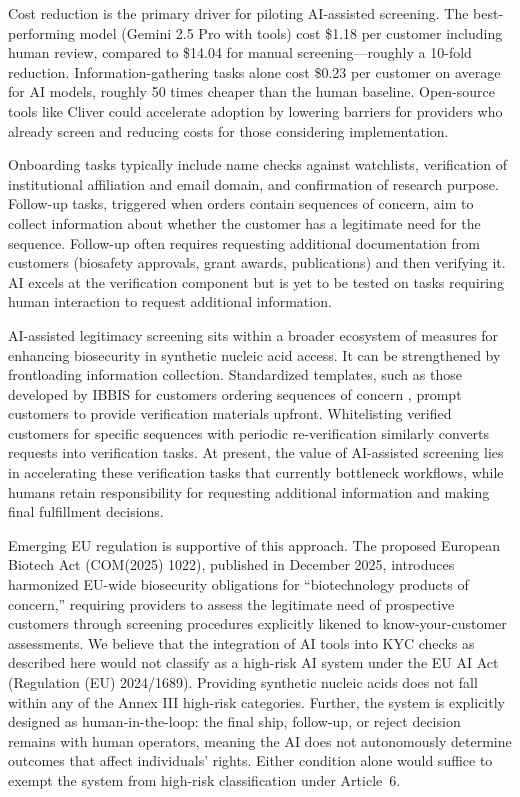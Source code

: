 \documentclass[utf8]{FrontiersinHarvard}
\begin{document}
Cost reduction is the primary driver for piloting AI-assisted screening. The best-performing model (Gemini 2.5 Pro with tools) cost \$1.18 per customer including human review, compared to \$14.04 for manual screening---roughly a 10-fold reduction. Information-gathering tasks alone cost \$0.23 per customer on average for AI models, roughly 50 times cheaper than the human baseline. Open-source tools like Cliver \citep{Cliver2025} could accelerate adoption by lowering barriers for providers who already screen and reducing costs for those considering implementation.

Onboarding tasks typically include name checks against watchlists, verification of institutional affiliation and email domain, and confirmation of research purpose. Follow-up tasks, triggered when orders contain sequences of concern, aim to collect information about whether the customer has a legitimate need for the sequence. Follow-up often requires requesting additional documentation from customers (biosafety approvals, grant awards, publications) and then verifying it. AI excels at the verification component but is yet to be tested on tasks requiring human interaction to request additional information.

AI-assisted legitimacy screening sits within a broader ecosystem of measures for enhancing biosecurity in synthetic nucleic acid access. It can be strengthened by frontloading information collection. Standardized templates, such as those developed by IBBIS for customers ordering sequences of concern \citep{IBBIS2025}, prompt customers to provide verification materials upfront. Whitelisting verified customers for specific sequences with periodic re-verification \citep{Crawford2024} similarly converts requests into verification tasks. At present, the value of AI-assisted screening lies in accelerating these verification tasks that currently bottleneck workflows, while humans retain responsibility for requesting additional information and making final fulfillment decisions.

Emerging EU regulation is supportive of this approach. The proposed European Biotech Act (COM(2025) 1022), published in December 2025, introduces harmonized EU-wide biosecurity obligations for ``biotechnology products of concern,'' requiring providers to assess the legitimate need of prospective customers through screening procedures explicitly likened to know-your-customer assessments. We believe that the integration of AI tools into KYC checks as described here would not classify as a high-risk AI system under the EU AI Act (Regulation (EU) 2024/1689). Providing synthetic nucleic acids does not fall within any of the Annex III high-risk categories. Further, the system is explicitly designed as human-in-the-loop: the final ship, follow-up, or reject decision remains with human operators, meaning the AI does not autonomously determine outcomes that affect individuals' rights. Either condition alone would suffice to exempt the system from high-risk classification under Article~6.
\end{document}
